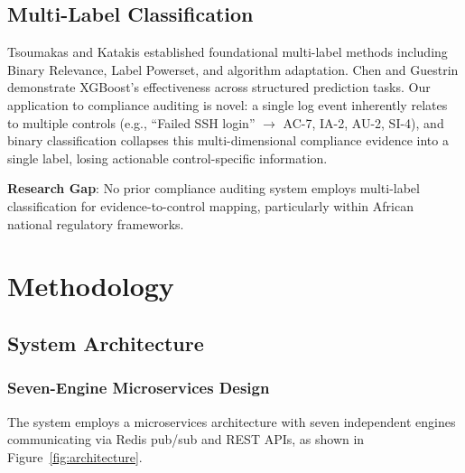 \documentclass[11pt,conference]{IEEEtran}
\begin{document}
\subsection{Multi-Label Classification}

Tsoumakas and Katakis \cite{tsoumakas2007} established foundational multi-label methods including Binary Relevance, Label Powerset, and algorithm adaptation. Chen and Guestrin \cite{chen2016xgboost} demonstrate XGBoost's effectiveness across structured prediction tasks. Our application to compliance auditing is novel: a single log event inherently relates to multiple controls (e.g., ``Failed SSH login'' $\rightarrow$ AC-7, IA-2, AU-2, SI-4), and binary classification collapses this multi-dimensional compliance evidence into a single label, losing actionable control-specific information.

\textbf{Research Gap}: No prior compliance auditing system employs multi-label classification for evidence-to-control mapping, particularly within African national regulatory frameworks.

\section{Methodology}

\subsection{System Architecture}

\subsubsection{Seven-Engine Microservices Design}

The system employs a microservices architecture with seven independent engines communicating via Redis pub/sub and REST APIs, as shown in Figure~\ref{fig:architecture}.
\end{document}
